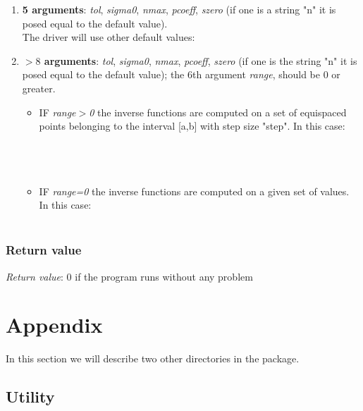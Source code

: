 \documentclass[10pt]{article}
\begin{document}
\begin{enumerate}
	  \item \textbf{5 arguments}: \emph{tol}, \emph{sigma0}, \emph{nmax}, \emph{pcoeff}, \emph{szero} (if one is a string "n" it is posed equal to the default value). \\The driver will use other default values:\\

	  \item \textbf{$>8$ arguments}: \emph{tol}, \emph{sigma0}, \emph{nmax}, \emph{pcoeff}, \emph{szero} (if one is the string "n" it is posed equal to the default value); the 6\textendash th argument \emph{range},  should be 0 or greater.
	  \begin{itemize}
	   \item  IF \emph{range$>$0} the inverse functions are computed on a set of equispaced points belonging to the interval [a,b] with step size "step". In this case:\\
			  \\
			  \\
			  \\
	    \item IF \emph{range=0} the inverse functions  are computed on a given set of values. In this case:\\
			  \\
	  \end{itemize}



\end{enumerate}


\subsubsection{Return value}
\emph{Return value}: 0 if the program runs without any problem



\section{Appendix}
In this section we will describe two other directories in the package.

\subsection{Utility}
\end{document}

